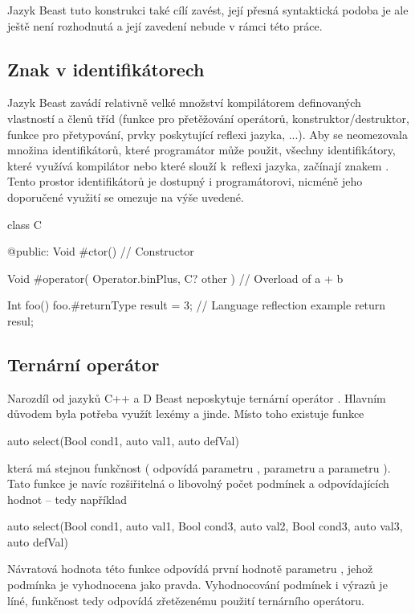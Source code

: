 Jazyk Beast tuto konstrukci také cílí zavést, její přesná syntaktická podoba je ale ještě není rozhodnutá a její zavedení nebude v rámci této práce.

\subsection{Znak \inlineCode{\#} v identifikátorech}
Jazyk Beast zavádí relativně velké množství kompilátorem definovaných vlastností a členů tříd (funkce pro přetěžování operátorů, konstruktor/destruktor, funkce pro přetypování, prvky poskytující reflexi jazyka, ...). Aby se neomezovala množina identifikátorů, které programátor může použit, všechny identifikátory, které využívá kompilátor nebo které slouží k~reflexi jazyka, začínají znakem \inlineCode{\#}. Tento prostor identifikátorů je dostupný i programátorovi, nicméně jeho doporučené využití se omezuje na výše uvedené.

\begin{code}
class C {

@public:
	Void #ctor() {
		// Constructor	
	}

	Void #operator( Operator.binPlus, C? other ) {
		// Overload of a + b
	}

	Int foo() {
		foo.#returnType	result = 3; // Language reflection example
		return resul;
	}
	
}
\end{code}

\subsection{Ternární operátor} \label{ternary}
Narozdíl od jazyků C++ a D Beast neposkytuje ternární operátor . Hlavním důvodem byla potřeba využít lexémy  a \inlineDCode{:} jinde. Místo toho existuje funkce 
\begin{code}
auto select(Bool cond1, auto val1, auto defVal)
\end{code}
která má stejnou funkčnost ( odpovídá parametru ,  parametru  a  parametru ). Tato funkce je navíc rozšiřitelná o libovolný počet podmínek a odpovídajících hodnot -- tedy například 
\begin{code}
auto select(Bool cond1, auto val1, Bool cond3, auto val2, Bool cond3, auto val3, auto defVal)
\end{code}
Návratová hodnota této funkce odpovídá první hodnotě parametru , jehož podmínka  je vyhodnocena jako pravda. Vyhodnocování podmínek i výrazů je líné, funkčnost tedy odpovídá zřetězenému použití ternárního operátoru.

